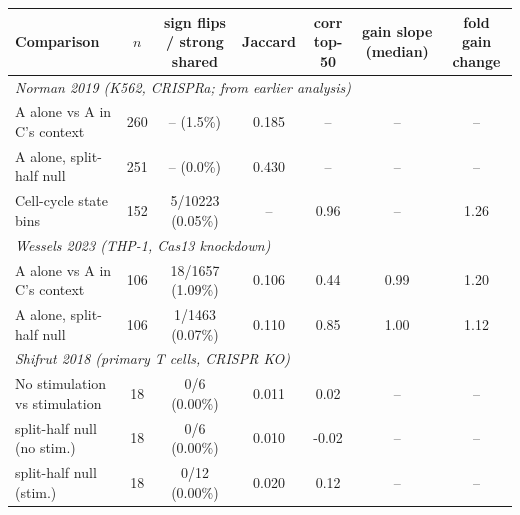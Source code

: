 \begin{tabular}{lcccccc}
\toprule
Comparison & $n$ & sign flips / strong shared & Jaccard & corr top-50 & gain slope (median) & fold gain change \\
\midrule
\multicolumn{7}{l}{\emph{Norman 2019 (K562, CRISPRa; from earlier analysis)}} \\
A alone vs A in C's context & 260 & -- (1.5\%) & 0.185 & -- & -- & -- \\
A alone, split-half null & 251 & -- (0.0\%) & 0.430 & -- & -- & -- \\
Cell-cycle state bins & 152 & 5/10223 (0.05\%) & -- & 0.96 & -- & 1.26 \\
\midrule \multicolumn{7}{l}{\emph{Wessels 2023 (THP-1, Cas13 knockdown)}} \\
A alone vs A in C's context & 106 & 18/1657 (1.09\%) & 0.106 & 0.44 & 0.99 & 1.20 \\
A alone, split-half null & 106 & 1/1463 (0.07\%) & 0.110 & 0.85 & 1.00 & 1.12 \\
\midrule \multicolumn{7}{l}{\emph{Shifrut 2018 (primary T cells, CRISPR KO)}} \\
No stimulation vs stimulation & 18 & 0/6 (0.00\%) & 0.011 & 0.02 & -- & -- \\
split-half null (no stim.) & 18 & 0/6 (0.00\%) & 0.010 & -0.02 & -- & -- \\
split-half null (stim.) & 18 & 0/12 (0.00\%) & 0.020 & 0.12 & -- & -- \\
\bottomrule
\end{tabular}
